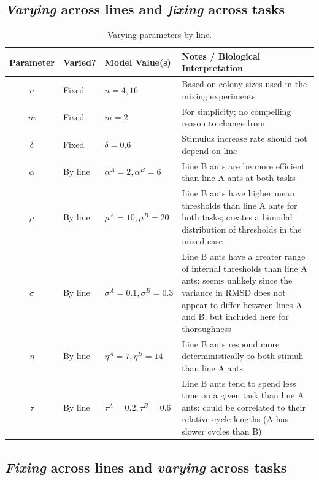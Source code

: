 \documentclass[11pt]{article}
\begin{document}
\subsection{\textit{Varying} across lines and \textit{fixing} across tasks}
\begin{table}[hbt!] \small
  \begin{center}
    \begin{tabular}{|c|>{\centering}m{0.65in}|>{\centering}m{1.15in}|m{3.5in}|} 
      \hline
      \textbf{Parameter} & \textbf{Varied?} & \textbf{Model Value(s)} & \textbf{Notes / Biological Interpretation} \\ \hline
      $n$ & Fixed & $n = 4, 16$ & Based on colony sizes used in the mixing experiments \\ \hline
      $m$ & Fixed & $m = 2$ & For simplicity; no compelling reason to change from \cite{ulrich2018} \\ \hline
      $\delta$ & Fixed & $\delta = 0.6$ & Stimulus increase rate should not depend on line\\ \hline
      $\alpha$ & By line  & $\alpha^A = 2,\alpha^B = 6$ & Line B ants are be more efficient than line A ants at both tasks \\ \hline
      $\mu$ & By line  & $\mu^A = 10,\mu^B = 20 $ & Line B ants have higher mean thresholds than line A ants for both tasks; creates a bimodal distribution of thresholds in the mixed case \\ \hline
      $\sigma$ & By line & $\sigma^A = 0.1, \sigma^B = 0.3$ & Line B ants have a greater range of internal thresholds than line A ants; seems unlikely since the variance in RMSD does not appear to differ between lines A and B, but included here for thoroughness \\ \hline
      $\eta$ & By line & $\eta^A = 7, \eta^B = 14 $ &  Line B ants respond more deterministically to both stimuli than line A ants\\ \hline
      $\tau$ & By line & $\tau^A = 0.2,\tau^B = 0.6 $ & Line B ants tend to spend less time on a given task than line A ants; could be correlated to their relative cycle lengths (A has slower cycles than B) \\ \hline
    \end{tabular}
    \caption{Varying parameters by line.}
    \label{tab:table2}
  \end{center}
\end{table}

\subsection{\textit{Fixing} across lines and \textit{varying} across tasks}
\end{document}
